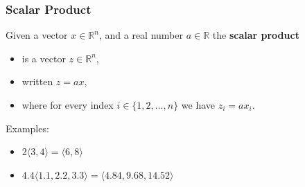 \documentclass[10pt]{article}
\begin{document}
\subsubsection*{Scalar Product}
Given a vector $x \in \mathbb{R}^n$, and a real number $a \in \mathbb{R}$ the \textbf{scalar product}
\begin{itemize}
	\item is a vector $z \in \mathbb{R}^n$,
	\item written $z = ax$,
	\item where for every index $i \in \{1, 2, \dots, n\}$ we have $z_i = ax_i$.
\end{itemize}
Examples:
\begin{itemize}
	\item $2 \langle 3, 4 \rangle = \langle 6, 8 \rangle$
	\item $4.4 \langle 1.1, 2.2, 3.3 \rangle = \langle 4.84, 9.68, 14.52 \rangle$
\end{itemize}
\end{document}
